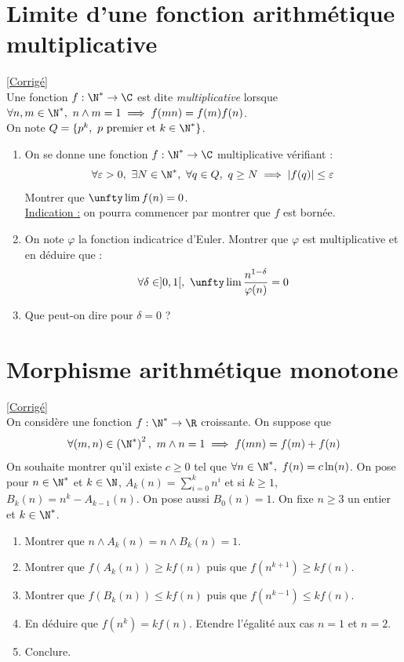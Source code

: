 \documentclass[8pt]{book}
\begin{document}
\section{Limite d'une fonction arithmétique multiplicative }
\label{Limite d'une fonction arithmétique multiplicative}
\textcolor{blue}{\hyperref[Limite d'une fonction arithmétique multiplicative corrigé]{[Corrigé]}}\\
Une fonction $f:\N^*\to \C$ est dite \textit{multiplicative} lorsque $\forall n,m\in \N^*,\ n\wedge m=1\implies f(mn)=f(m)f(n)$.\\
On note $Q=\{p^k,\ p\text{ premier et }k\in \N^*\}$.
\begin{enumerate}
	\item On se donne une fonction $f:\N^*\to\C$ multiplicative vérifiant :
	$$\forall \varepsilon>0,\ \exists N\in \N^*,\ \forall q\in Q,\ q\geq N\implies |f(q)|\leq \varepsilon$$
	Montrer que $\unfty\lim f(n)=0$.\\
	\underline{Indication :} on pourra commencer par montrer que $f$ est bornée.
	\item On note $\varphi$ la fonction indicatrice d'Euler. Montrer que $\varphi$ est multiplicative et en déduire que :
	$$\forall \delta\in ]0,1[,\ \unfty\lim\frac{n^{1-\delta}}{\varphi(n)}=0$$
	\item Que peut-on dire pour $\delta=0$ ?
\end{enumerate}

\section{Morphisme arithmétique monotone }
\label{Morphisme arithmétique monotone}
\textcolor{blue}{\hyperref[Morphisme arithmétique monotone corrigé]{[Corrigé]}}\\
On considère une fonction $f:\N^*\to \R$ croissante. On suppose que
$$\forall (m,n)\in \left(\N^*\right)^2,\ m\wedge n=1\implies f(mn)=f(m)+f(n)$$
On souhaite montrer qu'il existe $c\geq 0$ tel que $\forall n\in \N^*,\ f(n)=c\ln(n)$. On pose pour $n\in \N^*$ et $k\in \N$, $A_k(n)=\displaystyle\sum_{i=0}^kn^i$ et si $k\geq 1$, $B_k(n)=n^k-A_{k-1}(n)$. On pose aussi $B_0(n)=1$. On fixe $n\geq 3$ un entier et $k\in \N^*$.
\begin{enumerate}
	\item Montrer que $n\wedge A_k(n)=n\wedge B_k(n)=1$.
	\item Montrer que $f(A_k(n))\geq kf(n)$ puis que $f(n^{k+1})\geq kf(n)$.
	\item Montrer que $f(B_k(n))\leq kf(n)$ puis que $f(n^{k-1})\leq kf(n)$.
	\item En déduire que $f(n^k)=kf(n)$. Etendre l'égalité aux cas $n=1$ et $n=2$.
	\item Conclure.
\end{enumerate}
\end{document}
